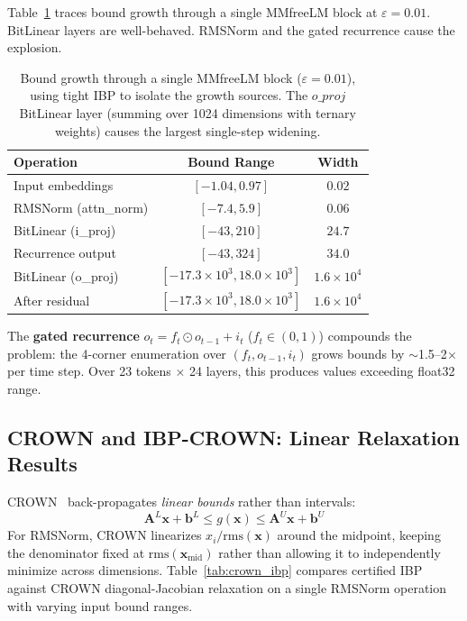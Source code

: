 \documentclass[11pt]{article}
\begin{document}
Table~\ref{tab:layer_growth} traces bound growth through a single MMfreeLM block at $\varepsilon{=}0.01$. BitLinear layers are well-behaved. RMSNorm and the gated recurrence cause the explosion.

\begin{table}[H]
    \centering
    \caption{Bound growth through a single MMfreeLM block ($\varepsilon{=}0.01$), using tight IBP to isolate the growth sources. The $o\_proj$ BitLinear layer (summing over 1024 dimensions with ternary weights) causes the largest single-step widening.}
    \label{tab:layer_growth}
    \begin{tabular}{lcc}
        \toprule
        \textbf{Operation} & \textbf{Bound Range} & \textbf{Width} \\
        \midrule
        Input embeddings      & $[-1.04, 0.97]$       & $0.02$ \\
        RMSNorm (attn\_norm)  & $[-7.4, 5.9]$         & $0.06$ \\
        BitLinear (i\_proj)   & $[-43, 210]$           & $24.7$ \\
        Recurrence output     & $[-43, 324]$           & $34.0$ \\
        BitLinear (o\_proj)   & $[-17.3{\times}10^3, 18.0{\times}10^3]$  & $1.6{\times}10^4$ \\
        After residual        & $[-17.3{\times}10^3, 18.0{\times}10^3]$  & $1.6{\times}10^4$ \\
        \bottomrule
    \end{tabular}
\end{table}

The \textbf{gated recurrence} $o_t = f_t \odot o_{t-1} + i_t$ ($f_t \in (0,1)$) compounds the problem: the 4-corner enumeration over $(f_t, o_{t-1}, i_t)$ grows bounds by $\sim$1.5--2$\times$ per time step. Over 23 tokens $\times$ 24 layers, this produces values exceeding float32 range.

\subsection{CROWN and IBP-CROWN: Linear Relaxation Results}

CROWN~\cite{zhang2018efficient} back-propagates \emph{linear bounds} rather than intervals:
\begin{equation}
\mathbf{A}^L \mathbf{x} + \mathbf{b}^L \leq g(\mathbf{x}) \leq \mathbf{A}^U \mathbf{x} + \mathbf{b}^U
\end{equation}
For RMSNorm, CROWN linearizes $x_i/\text{rms}(\mathbf{x})$ around the midpoint, keeping the denominator fixed at $\text{rms}(\mathbf{x}_{\text{mid}})$ rather than allowing it to independently minimize across dimensions. Table~\ref{tab:crown_ibp} compares certified IBP against CROWN diagonal-Jacobian relaxation on a single RMSNorm operation with varying input bound ranges.
\end{document}

